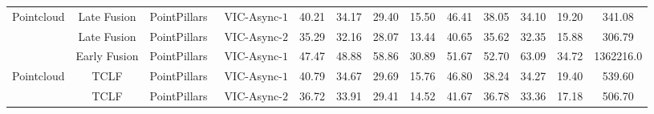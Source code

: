 \begin{table}[htpb!]
{\begin{tabular}{cccc|ccccccccc}
\multirow{3}{*}{Pointcloud} & 
  Late Fusion & PointPillars~\cite{lang2019pointpillars} & VIC-Async-$1$ &
  40.21 & 34.17 & 29.40 & 15.50 & 46.41 & 38.05 & 34.10 & 19.20 & 341.08 \\
  & Late Fusion & PointPillars~\cite{lang2019pointpillars} & VIC-Async-$2$ &
  35.29 & 32.16 & 28.07 & 13.44 & 40.65 & 35.62 & 32.35 & 15.88 & 306.79 \\
  & Early Fusion & PointPillars~\cite{lang2019pointpillars} & VIC-Async-$1$ & 47.47 & 48.88 & 58.86 & 30.89 & 51.67 & 52.70 & 63.09 & 34.72 & 1362216.0 \\
\hline\hline

\multirow{2}{*}{Pointcloud} &
TCLF & PointPillars~\cite{lang2019pointpillars} & VIC-Async-$1$ &
  40.79 & 34.67 & 29.69 & 15.76 & 46.80 & 38.24 & 34.27 & 19.40 & 539.60 \\
  & TCLF & PointPillars~\cite{lang2019pointpillars} & VIC-Async-$2$ &
  36.72 & 33.91 & 29.41 & 14.52 & 41.67 & 36.78 & 33.36 & 17.18 & 506.70 \\
\hline\hline

\hline
\end{tabular}
}
\end{table}

